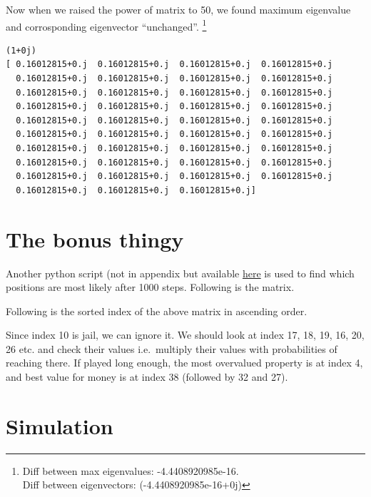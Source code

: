 \documentclass[]{article}
\begin{document}
Now when we raised the power of matrix to 50, we found maximum
eigenvalue and corrosponding eigenvector ``unchanged''.
\footnote{ Diff between max eigenvalues: -4.4408920985e-16. \\
Diff between eigenvectors: (-4.4408920985e-16+0j) 
}

\begin{verbatim}
(1+0j)
[ 0.16012815+0.j  0.16012815+0.j  0.16012815+0.j  0.16012815+0.j
  0.16012815+0.j  0.16012815+0.j  0.16012815+0.j  0.16012815+0.j
  0.16012815+0.j  0.16012815+0.j  0.16012815+0.j  0.16012815+0.j
  0.16012815+0.j  0.16012815+0.j  0.16012815+0.j  0.16012815+0.j
  0.16012815+0.j  0.16012815+0.j  0.16012815+0.j  0.16012815+0.j
  0.16012815+0.j  0.16012815+0.j  0.16012815+0.j  0.16012815+0.j
  0.16012815+0.j  0.16012815+0.j  0.16012815+0.j  0.16012815+0.j
  0.16012815+0.j  0.16012815+0.j  0.16012815+0.j  0.16012815+0.j
  0.16012815+0.j  0.16012815+0.j  0.16012815+0.j  0.16012815+0.j
  0.16012815+0.j  0.16012815+0.j  0.16012815+0.j]
\end{verbatim}

\section{The bonus thingy}\label{the-bonus-thingy}

Another python script (not in appendix but available
\href{http://github.com/dilawar/courses/raw/master/}{here} is used to
find which positions are most likely after 1000 steps. Following is the
matrix.

\begin{tiny}
    
\end{tiny}

Following is the sorted index of the above matrix in ascending order.

\begin{tiny}
    
\end{tiny}

Since index 10 is jail, we can ignore it. We should look at index 17,
18, 19, 16, 20, 26 etc. and check their values i.e.~multiply their
values with probabilities of reaching there. If played long enough, the
most overvalued property is at index 4, and best value for money is at
index 38 (followed by 32 and 27).

\section{Simulation}\label{simulation}
\end{document}
